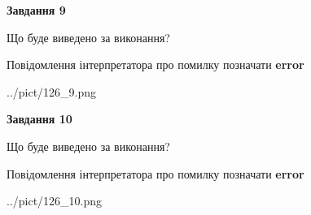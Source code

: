 \documentclass[12pt, ukrainian]{article}
\begin{document}
{{\begin {center}\textbf{Завдання 9}\end {center}}\par
Що буде виведено за виконання? \par
Повідомлення інтерпретатора про помилку позначати \textbf{error}

\begin{center}
	{../pict/126_9.png}
\end{center}
\newpage

{\begin {center}\textbf{Завдання 10}\end {center}}\par
Що буде виведено за виконання? \par
Повідомлення інтерпретатора про помилку позначати \textbf{error}

\begin{center}
	{../pict/126_10.png}
\end{center}
\newpage

}
\end{document}

